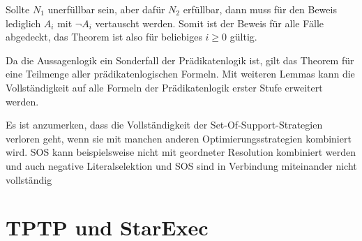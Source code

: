 Sollte $N_1$ unerfüllbar sein, aber dafür $N_2$ erfüllbar, dann muss für den Beweis lediglich $A_i$ mit $\neg A_i$ vertauscht werden. Somit ist der Beweis für alle Fälle abgedeckt, das Theorem ist also für beliebiges $i \geq 0$ gültig.

Da die Aussagenlogik ein Sonderfall der Prädikatenlogik ist, gilt das Theorem für eine Teilmenge aller prädikatenlogischen Formeln. Mit weiteren Lemmas kann die Vollständigkeit auf alle Formeln der Prädikatenlogik erster Stufe erweitert werden. \cite{Wos1965Sos}
		
Es ist anzumerken, dass die Vollständigkeit der Set-Of-Support-Strategien verloren geht, wenn sie mit manchen anderen Optimierungsstrategien kombiniert wird. SOS kann beispielsweise nicht mit geordneter Resolution kombiniert werden \cite{Sutcliffe2010Progress} und auch negative Literalselektion und SOS sind in Verbindung miteinander nicht vollständig \cite{nalon2016resolution}
		
	\section{TPTP und StarExec}
	
